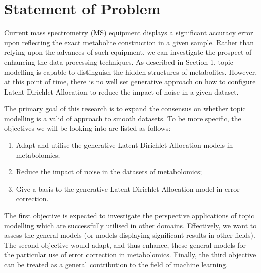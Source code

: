 \documentclass{mprop}
\begin{document}
\section{Statement of Problem}

\par Current mass spectrometry (MS) equipment displays a significant accuracy error upon reflecting the exact metabolite construction in a given sample. Rather than relying upon the advances of such equipment, we can investigate the prospect of enhancing the data processing techniques. As described in Section 1, topic modelling is capable to distinguish the hidden structures of metabolites. However, at this point of time, there is no well set generative approach on how to configure Latent Dirichlet Allocation to reduce the impact of noise in a given dataset.  

\par The primary goal of this research is to expand the consensus on whether topic modelling is a valid of approach to smooth datasets. To be more specific, the objectives we will be looking into are listed as follows:
\begin{enumerate}
    \item Adapt and utilise the generative Latent Dirichlet Allocation models in metabolomics;
    \item Reduce the impact of noise in the datasets of metabolomics;
    \item Give a basis to the generative Latent Dirichlet Allocation model in error correction.
\end{enumerate}
The first objective is expected to investigate the perspective applications of topic modelling which are successfully utilised in other domains. Effectively, we want to assess the general models (or models displaying significant results in other fields). The second objective would adapt, and thus enhance, these general models for the particular use of error correction in metabolomics. Finally, the third objective can be treated as a general contribution to the field of machine learning. 
\end{document}
